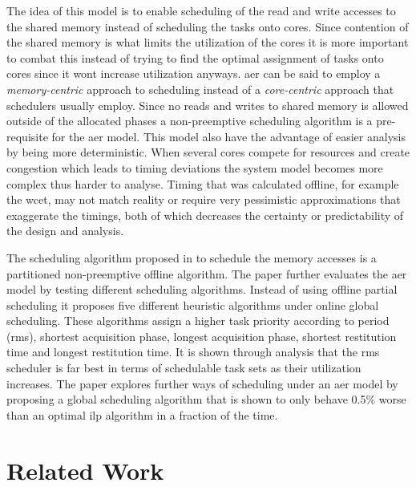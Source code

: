 \documentclass{kththesis}
\begin{document}
The idea of this model is to enable scheduling of the read and write accesses to the shared memory
instead of scheduling the tasks onto cores. Since contention of the shared memory is what limits the
utilization of the cores it is more important to combat this instead of trying to find the optimal
assignment of tasks onto cores since it wont increase utilization anyways. \acrshort{aer} can be
said to employ a \textit{memory-centric} approach to scheduling instead of a \textit{core-centric}
approach that schedulers usually employ. Since no reads and writes to shared memory is allowed
outside of the allocated phases a non-preemptive scheduling algorithm is a pre-requisite for the
\acrfull{aer} model. This model also have the advantage of easier analysis by being more
deterministic. When several cores compete for resources and create congestion which leads to timing
deviations the system model becomes more complex thus harder to analyse. Timing that was calculated
offline, for example the \acrshort{wcet}, may not match reality or require very pessimistic
approximations that exaggerate the timings, both of which decreases the certainty or predictability
of the design and analysis.

The scheduling algorithm proposed in \parencite{durrieu_predictable_2014} to schedule the memory
accesses is a partitioned non-preemptive offline algorithm. The paper \parencite{maia_closer_2016}
further evaluates the \acrshort{aer} model by testing different scheduling algorithms. Instead of
using offline partial scheduling it proposes five different heuristic algorithms under online global
scheduling. These algorithms assign a higher task priority according to period (\acrshort{rms}),
shortest acquisition phase, longest acquisition phase, shortest restitution time and longest
restitution time. It is shown through analysis that the \acrshort{rms} scheduler is far best in
terms of schedulable task sets as their utilization increases. The paper
\parencite{becker_contention-free_2016} explores further ways of scheduling under an \acrshort{aer}
model by proposing a global scheduling algorithm that is shown to only behave 0.5\% worse than an
optimal \acrshort{ilp} algorithm in a fraction of the time.



\section{Related Work}
\end{document}
